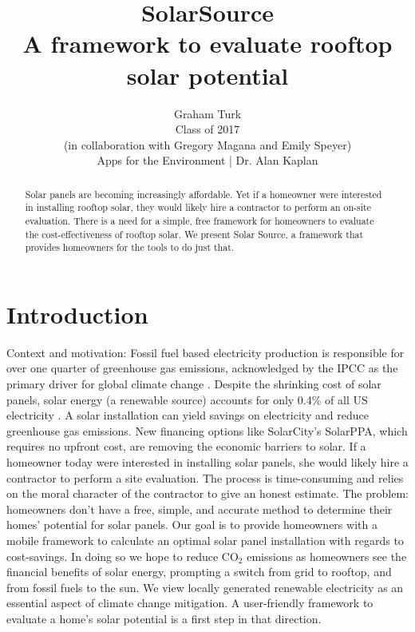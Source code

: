 \documentclass[pageno]{jpaper}
\begin{document}
\title{{\huge SolarSource} \\ {\large A framework to evaluate rooftop solar potential}}
\author{Graham Turk \\ {\normalsize Class of 2017} \\ {\normalsize (in collaboration with Gregory Magana and Emily Speyer)} \\ {\normalsize Apps for the Environment | Dr. Alan Kaplan}}

\date{}
\maketitle

\thispagestyle{empty}

\begin{abstract}
Solar panels are becoming increasingly affordable. Yet if a homeowner were interested in installing rooftop solar, they would likely hire a contractor to perform an on-site evaluation. There is a need for a simple, free framework for homeowners to evaluate the cost-effectiveness of rooftop solar. We present Solar Source, a framework that provides homeowners for the tools to do just that.
\end{abstract}

\section{Introduction}
Context and motivation: Fossil fuel based electricity production is responsible for over one quarter of greenhouse gas emissions, acknowledged by the IPCC as the primary driver for global climate change \cite{IPCC}. Despite the shrinking cost of solar panels, solar energy (a renewable source) accounts for only 0.4\% of all US electricity \cite{USEIA}. A solar installation can yield savings on electricity and reduce greenhouse gas emissions. New financing options like SolarCity's SolarPPA, which requires no upfront cost, are removing the economic barriers to solar. \newline
\indent If a homeowner today were interested in installing solar panels, she would likely hire a contractor to perform a site evaluation. The process is time-consuming and relies on the moral character of the contractor to give an honest estimate. The problem: homeowners don't have a free, simple, and accurate method to determine their homes' potential for solar panels. Our goal is to provide homeowners with a mobile framework to calculate an optimal solar panel installation with regards to cost-savings. In doing so we hope to reduce $\mbox{CO}_2$ emissions as homeowners see the financial benefits of solar energy, prompting a switch from grid to rooftop, and from fossil fuels to the sun. We view locally generated renewable electricity as an essential aspect of climate change mitigation. A user-friendly framework to evaluate a home's solar potential is a first step in that direction.
\end{document}
